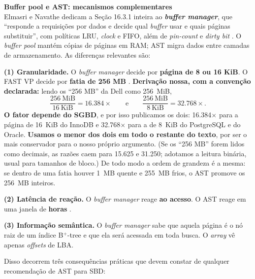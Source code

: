 \documentclass[11pt,a4paper]{article}
\newcommand{\destaque}[2]{%
  \begin{center}\begin{minipage}{0.96\textwidth}
  \colorbox{fundo}{\begin{minipage}{\dimexpr\linewidth-2\fboxsep}
  \vspace{2pt}\textbf{\color{azul}\small #1}\\[1pt]\footnotesize #2\vspace{3pt}
  \end{minipage}}\end{minipage}\end{center}}
\begin{document}
\destaque{Buffer pool e AST: mecanismos complementares}{%
Elmasri e Navathe dedicam a Seção 16.3.1 inteira ao \textbf{\textit{buffer manager}}, que ``responde
a requisições por dados e decide qual \textit{buffer} usar e quais páginas substituir'', com
políticas LRU, \textit{clock} e FIFO, além de \textit{pin-count} e \textit{dirty bit}
\cite{elmasri2018}. O \textit{buffer pool} mantém cópias de páginas em RAM; AST migra dados entre camadas de armazenamento. As diferenças relevantes são:

\smallskip
\textbf{(1) Granularidade.} O \textit{buffer manager} decide por \textbf{página de 8 ou 16 KiB}. O
FAST VP decide por \textbf{fatia de 256 MB} \cite{dellfast}. \textbf{Derivação nossa, com a
convenção declarada:} lendo os ``256 MB'' da Dell como 256~MiB,
\[
\frac{256\ \text{MiB}}{16\ \text{KiB}} = \mathbf{16.384\times}
\qquad\text{e}\qquad
\frac{256\ \text{MiB}}{8\ \text{KiB}} = \mathbf{32.768\times}.
\]
\textbf{O fator depende do SGBD}, e por isso publicamos os dois: 16.384$\times$ para a página de
16~KiB do InnoDB e 32.768$\times$ para a de 8~KiB do PostgreSQL e do Oracle. \textbf{Usamos o menor
dos dois em todo o restante do texto}, por ser o mais conservador para o nosso próprio argumento.
(Se os ``256 MB'' forem lidos como decimais, as razões caem para 15.625 e 31.250; adotamos a leitura
binária, usual para tamanhos de bloco.) De todo modo a ordem de grandeza é a mesma: se dentro de uma
fatia houver 1~MB quente e 255~MB frios, o AST promove os 256~MB inteiros.

\smallskip
\textbf{(2) Latência de reação.} O \textit{buffer manager} reage \textbf{ao acesso}. O AST reage em
uma janela de \textbf{horas} \cite{dellfast}.

\smallskip
\textbf{(3) Informação semântica.} O \textit{buffer manager} sabe que aquela página é o nó raiz de
um índice B$^+$-tree e que ela será acessada em toda busca. O \textit{array} vê apenas
\textit{offsets} de LBA.}

Disso decorrem três consequências práticas que devem constar de qualquer recomendação de AST para
SBD:
\end{document}
